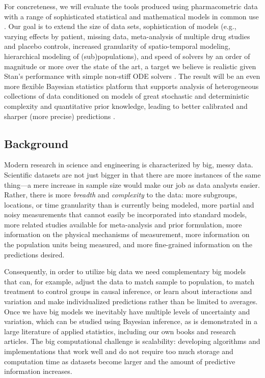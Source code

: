 For concreteness, we will evaluate the tools produced using
pharmacometric data with a range of sophisticated statistical and
mathematical models in common use \citep[e.g.,][]{ette-williams:2007,
  schmidt-derendorf:2014}. Our goal is to extend the size of data
sets, sophistication of models (e.g., varying effects by patient,
missing data, meta-analysis of multiple drug studies and placebo
controls, increased granularity of spatio-temporal modeling,
hierarchical modeling of (sub)populations), and speed of solvers by an
order of magnitude or more over the state of the art, a target we
believe is realistic given Stan's performance with simple non-stiff
ODE solvers \citep{weber-et-al:2014}.  The result will be an even more
flexible Bayesian statistics platform that supports analysis of
heterogeneous collections of data conditioned on models of great
stochastic and deterministic complexity and quantitative prior
knowledge, leading to better calibrated and sharper (more precise)
predictions \citep[see, e.g.,][]{gneiting-et-al:2007}.

\subsection{Background}

Modern research in science and engineering is characterized by big,
messy data. Scientific datasets are not just bigger in that there are
more instances of the same thing---a mere increase in sample size
would make our job as data analysts easier. Rather, there is more {\em
  breadth} and {\em complexity} to the data: more subgroups,
locations, or time granularity than is currently being modeled, more
partial and noisy measurements that cannot easily be incorporated into
standard models, more related studies available for meta-analysis and
prior formulation, more information on the physical mechanisms of
measurement, more information on the population units being measured,
and more fine-grained information on the predictions desired.

Consequently, in order to utilize big data we need complementary big
models that can, for example, adjust the data to match sample to
population, to match treatment to control groups in causal inference,
or learn about interactions and variation and make individualized
predictions rather than be limited to averages.  Once we have big
models we inevitably have multiple levels of uncertainty and
variation, which can be studied using Bayesian inference, as is
demonstrated in a large literature of applied statistics, including
our own books and research articles. The big computational challenge
is scalability: developing algorithms and implementations that work
well and do not require too much storage and computation time as
datasets become larger and the amount of predictive information
increases.

